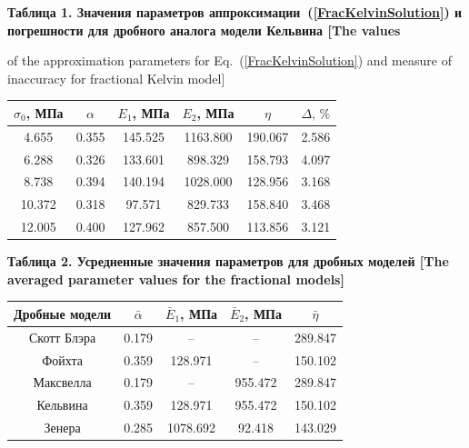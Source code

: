 \smallskip

\begin{center}
{\bf\footnotesize Таблица 1. Значения параметров аппроксимации~(\ref{FracKelvinSolution}) и погрешности для дробного аналога модели Кельвина
[The values \par of the approximation parameters for Eq.~(\ref{FracKelvinSolution}) and measure of inaccuracy for fractional Kelvin model] }


        \begin{tabular}{|c||c|c|c|c|c|}
\hline
\rule{0mm}{11pt}%
\footnotesize $\sigma_{0}$, МПа & \footnotesize  $\alpha$ & \footnotesize  $E_{1}$, МПа & \footnotesize  $E_{2}$, МПа & \footnotesize  $\eta$ & \footnotesize  $\Delta,\, \%$ \\
            \hline
            \rule{0mm}{12pt}%
            \phantom{1}4.655 & 0.355 & 145.525 & 1163.800 & 190.067 & 2.586 \\
             \phantom{1}6.288 & 0.326 & 133.601 & \phantom{1}898.329 & 158.793 & 4.097 \\
             \phantom{1}8.738 & 0.394 & 140.194 & 1028.000 & 128.956 & 3.168 \\
             10.372 & 0.318 & \phantom{1}97.571 & \phantom{1}829.733 & 158.840 & 3.468 \\
             12.005 & 0.400 & 127.962 & \phantom{1}857.500 & 113.856 & 3.121 \\
            \hline
        \end{tabular}

\smallskip

{\bf\footnotesize Таблица 2. Усредненные значения параметров для дробных моделей
[The averaged parameter values for the fractional models] }

\begin{tabular}{|c||c|c|c|c|} %
\hline
\rule{0mm}{11pt}%
\footnotesize Дробные модели & \footnotesize  $\bar{\alpha}$ & \footnotesize  $\bar{E}_{1}$, МПа & \footnotesize  $\bar{E}_{2}$, МПа & \footnotesize  $\bar{\eta}$  \\
            \hline
            \rule{0mm}{12pt}%
            Скотт Блэра & 0.179  &  --  &  --  & 289.847   \\
            Фойхта & 0.359  & \phantom{1}128.971 & -- &  150.102 \\
            Максвелла & 0.179 &  --  & 955.472 & 289.847 \\
            Кельвина & 0.359 & \phantom{1}128.971 & 955.472 & 150.102 \\
            Зенера & 0.285 & 1078.692 & \phantom{1}92.418 & 143.029 \\
            \hline
        \end{tabular}


\end{center}
